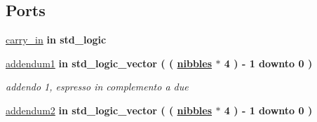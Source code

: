 \subsection*{Ports}
 \begin{DoxyCompactItemize}
\item 
\hyperlink{group___carry_loockahead_ga1c211cdf2d4cf97e869c442832c53439}{carry\+\_\+in}  {\bfseries {\bfseries \textcolor{vhdlchar}{in}\textcolor{vhdlchar}{ }}} {\bfseries \textcolor{vhdlchar}{std\+\_\+logic}\textcolor{vhdlchar}{ }} 
\item 
\hyperlink{group___carry_loockahead_gae4a2e124144a2f35270a55f0cf32a5ee}{addendum1}  {\bfseries {\bfseries \textcolor{vhdlchar}{in}\textcolor{vhdlchar}{ }}} {\bfseries \textcolor{vhdlchar}{std\+\_\+logic\+\_\+vector}\textcolor{vhdlchar}{ }\textcolor{vhdlchar}{(}\textcolor{vhdlchar}{ }\textcolor{vhdlchar}{(}\textcolor{vhdlchar}{ }\textcolor{vhdlchar}{ }\textcolor{vhdlchar}{ }\textcolor{vhdlchar}{ }{\bfseries \hyperlink{group___carry_loockahead_ga0b63b586531492d0fa882246cca071c1}{nibbles}} \textcolor{vhdlchar}{$\ast$}\textcolor{vhdlchar}{ } \textcolor{vhdldigit}{4} \textcolor{vhdlchar}{ }\textcolor{vhdlchar}{)}\textcolor{vhdlchar}{ }\textcolor{vhdlchar}{-\/}\textcolor{vhdlchar}{ } \textcolor{vhdldigit}{1} \textcolor{vhdlchar}{ }\textcolor{vhdlchar}{downto}\textcolor{vhdlchar}{ }\textcolor{vhdlchar}{ } \textcolor{vhdldigit}{0} \textcolor{vhdlchar}{ }\textcolor{vhdlchar}{)}\textcolor{vhdlchar}{ }} 
\begin{DoxyCompactList}\small\item\em addendo 1, espresso in complemento a due \end{DoxyCompactList}\item 
\hyperlink{group___carry_loockahead_ga2715463c615cf8418f85c6a1427ce62c}{addendum2}  {\bfseries {\bfseries \textcolor{vhdlchar}{in}\textcolor{vhdlchar}{ }}} {\bfseries \textcolor{vhdlchar}{std\+\_\+logic\+\_\+vector}\textcolor{vhdlchar}{ }\textcolor{vhdlchar}{(}\textcolor{vhdlchar}{ }\textcolor{vhdlchar}{(}\textcolor{vhdlchar}{ }\textcolor{vhdlchar}{ }\textcolor{vhdlchar}{ }\textcolor{vhdlchar}{ }{\bfseries \hyperlink{group___carry_loockahead_ga0b63b586531492d0fa882246cca071c1}{nibbles}} \textcolor{vhdlchar}{$\ast$}\textcolor{vhdlchar}{ } \textcolor{vhdldigit}{4} \textcolor{vhdlchar}{ }\textcolor{vhdlchar}{)}\textcolor{vhdlchar}{ }\textcolor{vhdlchar}{-\/}\textcolor{vhdlchar}{ } \textcolor{vhdldigit}{1} \textcolor{vhdlchar}{ }\textcolor{vhdlchar}{downto}\textcolor{vhdlchar}{ }\textcolor{vhdlchar}{ } \textcolor{vhdldigit}{0} \textcolor{vhdlchar}{ }\textcolor{vhdlchar}{)}\textcolor{vhdlchar}{ }} 

\end{DoxyCompactItemize}

